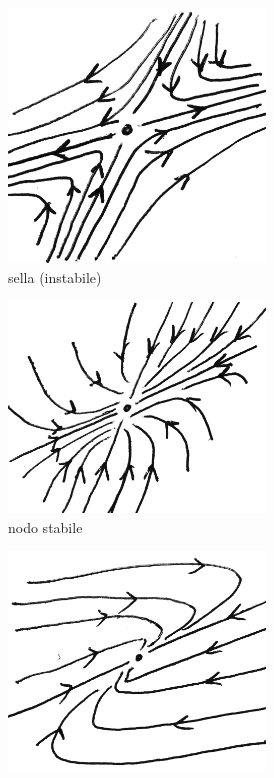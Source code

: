 \documentclass[italian,a4paper]{scrartcl}
\begin{document}
\begin{figure}
\centering
 \begin{subfigure}{5cm}
  \includegraphics[width=0.75\textwidth]{sistemi_sella.png}
  \caption[1a]{sella (instabile)}
 \end{subfigure}
 \begin{subfigure}{5cm}
  \includegraphics[width=0.75\textwidth]{sistemi_nodo.png}
  \caption{nodo stabile}
 \end{subfigure}
 \begin{subfigure}{5cm}
  \includegraphics[width=0.75\textwidth]{sistemi_nodo_improprio.png}

\end{subfigure}
\end{figure}
\end{document}
